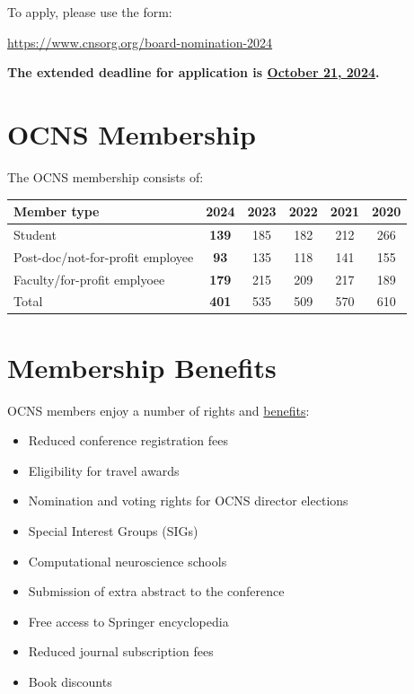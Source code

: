 \documentclass[11pt,a4paper,oneside]{article}
\begin{document}
To apply, please use the form:

\begin{center}
\url{https://www.cnsorg.org/board-nomination-2024}
\end{center}

\vspace{2ex}
\textbf{The extended deadline for application is \underline{October 21, 2024}.}

\clearpage
\section*{OCNS Membership}%

The OCNS membership consists of:
\begin{table}[!h]
  \centering
  \begin{tabularx}{0.7\textwidth}{X|ccccc}
    \textbf{Member type}& \textbf{2024} & \textbf{2023} & \textbf{2022} & \textbf{2021} & \textbf{2020} \\
    \toprule{}
    Student & \textbf{139} &  185 & 182 & 212 & 266 \\
    Post-doc/not-for-profit employee & \textbf{93} & 135 & 118 & 141 & 155 \\
    Faculty/for-profit emplyoee & \textbf{179} & 215 & 209 & 217 & 189 \\
    \midrule{}
    Total & \textbf{401} & 535 & 509 & 570 & 610 \\
  \end{tabularx}
\end{table}

\section*{Membership Benefits}%
\sectionauthor{\vspace{-4ex}}

OCNS members enjoy a number of rights and \href{https://www.cnsorg.org/member-benefits}{benefits}:
\begin{multicols}{2}
  \begin{itemize}
    \item Reduced conference registration fees
    \item Eligibility for travel awards
    \item Nomination and voting rights for OCNS director elections
    \item Special Interest Groups (SIGs)
    \item Computational neuroscience schools
    \item Submission of extra abstract to the conference
    \item Free access to Springer encyclopedia
    \item Reduced journal subscription fees
    \item Book discounts
  \end{itemize}
\end{multicols}
\end{document}
